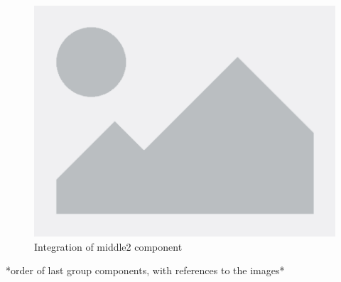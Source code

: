 \documentclass[table, 12pt]{article}
\begin{document}
\begin{figure}[H]
    \centering
    \includegraphics[scale=0.55]{assets/placeholder.png}%
    \caption{Integration of middle2 component}%
    \label{fig: integration_ForumManager_LocationModule}%
\end{figure}

*order of last group components, with references to the images*
\end{document}
